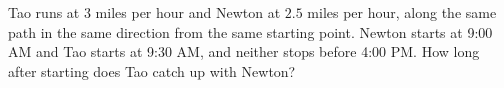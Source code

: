 Tao runs at $3$ miles per hour and Newton at $2.5$ miles per hour, along the same path in the same direction from the same starting point. Newton starts at 9:00 AM and Tao starts at 9:30 AM, and neither stops before 4:00 PM. How long after starting does Tao catch up with Newton?
